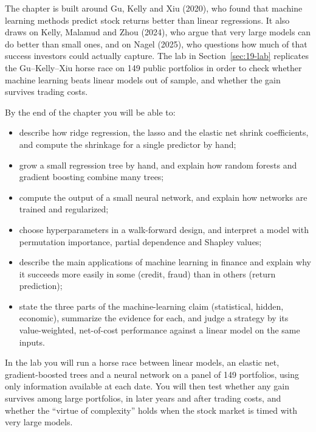 The chapter is built around Gu, Kelly and Xiu (2020), who found that machine learning methods predict stock returns better than linear regressions. It also draws on Kelly, Malamud and Zhou (2024), who argue that very large models can do better than small ones, and on Nagel (2025), who questions how much of that success investors could actually capture. The lab in Section~\ref{sec:19-lab} replicates the Gu--Kelly--Xiu horse race on 149 public portfolios in order to check whether machine learning beats linear models out of sample, and whether the gain survives trading costs.

By the end of the chapter you will be able to:

\begin{itemize}
  \item describe how ridge regression, the lasso and the elastic net shrink coefficients, and compute the shrinkage for a single predictor by hand;
  \item grow a small regression tree by hand, and explain how random forests and gradient boosting combine many trees;
  \item compute the output of a small neural network, and explain how networks are trained and regularized;
  \item choose hyperparameters in a walk-forward design, and interpret a model with permutation importance, partial dependence and Shapley values;
  \item describe the main applications of machine learning in finance and explain why it succeeds more easily in some (credit, fraud) than in others (return prediction);
  \item state the three parts of the machine-learning claim (statistical, hidden, economic), summarize the evidence for each, and judge a strategy by its value-weighted, net-of-cost performance against a linear model on the same inputs.
\end{itemize}

In the lab you will run a horse race between linear models, an elastic net, gradient-boosted trees and a neural network on a panel of 149 portfolios, using only information available at each date. You will then test whether any gain survives among large portfolios, in later years and after trading costs, and whether the ``virtue of complexity'' holds when the stock market is timed with very large models.

